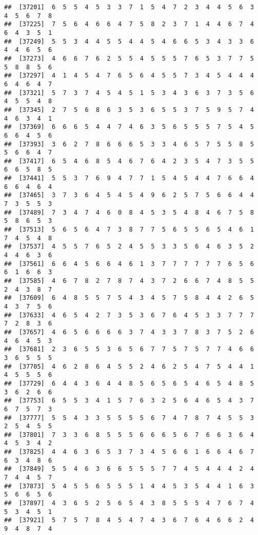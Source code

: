 \documentclass[
]{book}
\begin{document}
\begin{verbatim}
##  [37201]  6  5  5  4  5  3  3  7  1  5  4  7  2  3  4  4  5  6  3  4  5  6  7  8
##  [37225]  7  5  6  4  6  6  4  7  5  8  2  3  7  1  4  4  6  7  4  6  4  3  5  1
##  [37249]  5  5  3  4  4  5  5  4  4  5  4  6  6  5  3  4  3  3  6  4  4  6  5  6
##  [37273]  4  6  6  7  6  2  5  5  4  5  5  5  7  6  5  3  7  7  5  5  8  8  5  6
##  [37297]  4  1  4  5  4  7  6  5  6  4  5  5  7  3  4  5  4  4  4  6  4  6  4  7
##  [37321]  5  7  3  7  4  5  4  5  1  5  3  4  3  6  3  7  3  5  6  4  5  5  4  8
##  [37345]  2  7  5  6  8  6  3  5  3  6  5  5  3  7  5  9  5  7  4  4  6  3  4  1
##  [37369]  6  6  6  5  4  4  7  4  6  3  5  6  5  5  5  7  5  4  5  6  6  4  5  6
##  [37393]  3  6  2  7  8  6  6  6  5  3  3  4  6  5  7  5  5  8  5  5  6  6  4  7
##  [37417]  6  5  4  6  8  5  4  6  7  6  4  2  3  5  4  7  3  5  5  6  6  5  8  5
##  [37441]  5  5  3  7  6  9  4  7  7  1  5  4  5  4  4  7  6  6  4  6  6  4  6  4
##  [37465]  3  7  3  6  4  5  4  5  4  9  6  2  5  7  5  6  6  4  4  7  3  5  5  3
##  [37489]  7  3  4  7  4  6  0  8  4  5  3  5  4  8  4  6  7  5  8  5  8  6  5  3
##  [37513]  5  6  5  6  4  7  3  8  7  7  5  6  5  5  6  5  4  6  1  7  4  5  4  8
##  [37537]  4  5  5  7  6  5  2  4  5  5  3  3  5  6  4  6  3  5  2  4  4  6  3  6
##  [37561]  6  6  4  5  6  6  4  6  1  3  7  7  7  7  7  7  6  5  6  6  1  6  6  3
##  [37585]  4  6  7  8  2  7  8  7  4  3  7  2  6  6  7  4  8  5  5  2  4  3  8  7
##  [37609]  6  4  8  5  5  7  5  4  3  4  5  7  5  8  4  4  2  6  5  4  3  7  5  6
##  [37633]  4  6  5  4  2  7  3  5  3  6  7  6  4  5  3  3  7  7  7  7  2  8  3  6
##  [37657]  4  6  5  6  6  6  6  3  7  4  3  3  7  8  3  7  5  2  6  4  6  4  5  3
##  [37681]  2  3  6  5  5  3  6  5  6  7  7  5  7  5  7  7  4  6  6  3  6  5  5  5
##  [37705]  4  6  2  8  6  4  5  5  2  4  6  2  5  4  7  5  4  4  1  4  5  5  5  6
##  [37729]  6  4  4  3  6  4  4  8  5  6  5  6  5  4  6  5  4  8  5  3  6  2  6  6
##  [37753]  6  5  5  3  4  1  5  7  6  3  2  5  6  4  6  5  4  3  7  6  7  5  7  3
##  [37777]  5  5  4  3  3  5  5  5  5  6  7  4  7  8  7  4  5  5  3  2  5  4  5  5
##  [37801]  7  3  3  6  8  5  5  5  6  6  6  5  6  7  6  6  3  6  4  4  5  3  4  2
##  [37825]  4  4  6  3  6  5  3  7  3  4  5  6  6  1  6  6  4  6  7  6  3  4  8  6
##  [37849]  5  5  4  6  3  6  6  5  5  5  7  7  4  5  4  4  4  2  4  7  4  4  5  7
##  [37873]  5  4  5  5  6  5  5  5  1  4  4  5  3  5  4  4  1  6  3  5  6  6  5  6
##  [37897]  4  3  6  5  2  5  6  5  4  3  8  5  5  5  4  7  6  7  4  5  3  4  5  1
##  [37921]  5  7  5  7  8  4  5  4  7  4  3  6  7  6  4  6  6  2  4  9  4  8  7  4

\end{verbatim}
\end{document}

